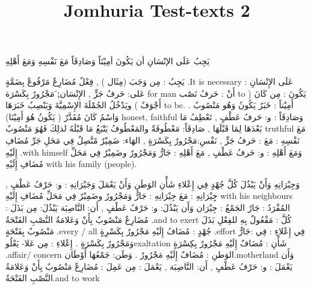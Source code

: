 \documentclass[a4paper]{article}
\title{Jomhuria Test-texts 2}
\begin{document}
\pagecolor{pagecolor}
\color{textcolor}

\begin{english}\maketitle\end{english}
\newpage

\begin{flushright}

\huge
يَجِبُ عَلَى الإنْسَانِ أن يَكُونَ أمِيْنَاً وَصَادِقَاً مَعَ نَفْسِهِ وَمَعَ أَهْلِهِ

يَجِبُ : مِن وَجَبَ (مِثَال ) , فِعْلٌ مُضَارِعٌ مَرْفُوعٌ بِضَمَّةٍ .It is necessary
عَلَى الإِنْسَانِ : عَلى: حَرفُ جَرٍّ , الإِنْسَان:ِ َمَجْرُورٌ بِكَسْرَة  for man
أَنْ : حَرفُ نَصْب to
يَكُونَ : مِن كَانَ ( أَجْوَفٌ ) ويَدْخُلُ الجُمْلَةَ الإِسْمِيَّةَ وَيَنْصِبُ خَبَرَهَا to be.
أَمِيْناً : خَبَرُ يَكُونُ وَهُو مَنْصُوبٌ . وَاسْمُ كَانَ مُقَدَّرٌ ( يَكُونُ هُوَ أَمِيْنَا) honest, faithful
وَصَادِقَاً : و: حَرفُ عَطْفٍ , تَعْطِفُ مَا بَعْدَهَا لِمَا قَبْلَهَا , صَادِقَاً: مَعْطُوفَةٌ
            والمَعْطُوفُ يَتْبَعُ مَا قَبْلَهُ لذلِكَ فَهُوَ مَنْصُوبٌ  truthful
مَعَ نَفْسِهِ : مَعَ : حَرفُ جَرٍّ , نَفْسِ:مَجْرُورٌ بِكَسْرَةٍ , الهَاء: ضَمِيْرٌ مًتَّصِلٌ
            فِي مَحَلِ جَرِّ مُضَافِ إِلَيْهِ .with himself
وَمَعَ أَهْلِهِ : و: حَرفُ عَطْفٍ , مَعَ أَهْلِهِ : جَارٌّ وَمَجْرُورٌ وضَمِيْرٌ فِي مَحَلِّ
            مُضَافِ إِلَيْهِ with his family (people).

وَجِيْرَانِهِ وَأَنْ يَبْذُلَ كُلَّ جُهْدٍ فِي إِعْلاءِ شَأْنِ الوَطَنِ وَأَنْ يَعْمَلَ
وَجَيْرَانِهِ : و: حَرْفُ عَطْفٍ , جِِيْرَانِهِ : مَعَ جِيْرَانِهِ : جَارٌّ وَمَجْرُورٌ
                وضَمِيْرٌ فِي مَحَلِّ مُضَافِ إِلَيْهِ with his neighbours
                المُفْرَدُ : جَارٌ       الجَمْعُ : جِيْرَان
وَأَن يَبْذُلَ: و: حَرْفُ عَطْفٍ , أَن: النَّاصِبَة      يَبْذُلَ: مِن بَذَلَ : مُضَارِعٌ
            مَنْصُوبٌ بِأَنْ وَعَلامَةُ النَّصْبِ الفَتْحَةُ .and to exert
كُلَّ :          مَفْعُولٌ بِهِ للفِعْلِ بَذَلَ مَنْصُوبٌ بِفَتْحَةٍ .every / all
جُهْدٍ : مُضَافُ إِلَيْهِ مَجْرُورٌ بِكَسْرِةٍ .effort
فِي إِعْلاءِ : فِي :جَارٌّ وَمَجْرُورٌ بِكَسْرَةٍ . إِعْلاءِ : مِن عَلا- يَعْلُوexaltation
شَأْنِ : مُضَافٌ إِلَيْهِ مَجْرُورٌ بِكِسْرَةٍ .affair/ concern
الوَطنِ : مُضَافٌ إِلَيْهِ مَجْرُورٌ . وَطَن: جَمْعُهَا أَوْطَان.motherland
وَأَن يَعْمَلَ : و: حَرْفُ عَطْفٍ , أَن: النَّاصِبَة , يَعْمَلَ : مِن عَمِلَ : مُضَارِعٌ
            مَنْصُوبٌ بِأَنْ وَعَلامَةُ النَّصْبِ الفَتْحَةُ.and to work


\end{flushright}
\end{document}
